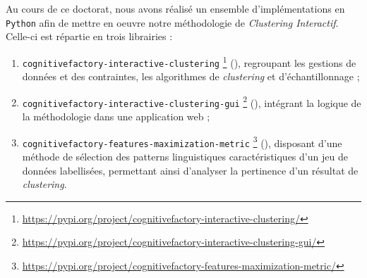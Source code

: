 		Au cours de ce doctorat, nous avons réalisé un ensemble d'implémentations en \texttt{Python} afin de mettre en oeuvre notre méthodologie de \textit{Clustering Interactif}.
		Celle-ci est répartie en trois librairies :
		\begin{enumerate}
			\item \texttt{cognitivefactory-interactive-clustering} \footnote{
				\url{https://pypi.org/project/cognitivefactory-interactive-clustering/}
			} (\cite{schild:2022:cognitivefactory-interactiveclustering}), regroupant les gestions de données et des contraintes, les algorithmes de \textit{clustering} et d'échantillonnage ;
			\item \texttt{cognitivefactory-interactive-clustering-gui} \footnote{
				\url{https://pypi.org/project/cognitivefactory-interactive-clustering-gui/}
			} (\cite{schild-etal:2022:cognitivefactory-interactiveclusteringgui}), intégrant la logique de la méthodologie dans une application web ;
			\item \texttt{cognitivefactory-features-maximization-metric} \footnote{
				\url{https://pypi.org/project/cognitivefactory-features-maximization-metric/}
			} (\cite{schild:2023:cognitivefactory-featuresmaximizationmetric}), disposant d'une méthode de sélection des patterns linguistiques caractéristiques d'un jeu de données labellisées, permettant ainsi d'analyser la pertinence d'un résultat de \textit{clustering}.
		\end{enumerate}
		
